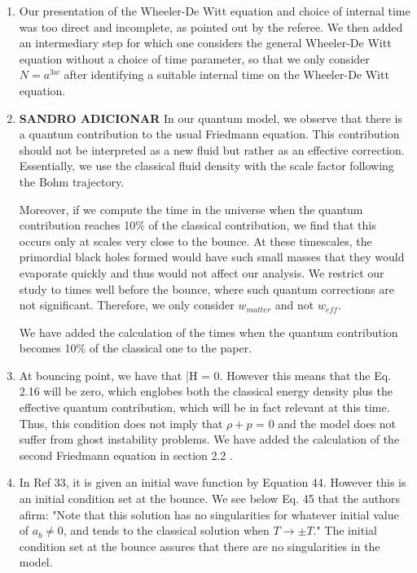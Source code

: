 \documentclass[a4paper,11pt]{article}
\begin{document}
\begin{enumerate}
    \begin{enumerate}
        \item Our presentation of the Wheeler-De Witt equation and choice of internal time was too direct and incomplete, as pointed out by the referee. We then added an intermediary step for which one considers the general Wheeler-De Witt equation without a choice of time parameter, so that we only consider $N = a^{3w}$ after identifying a suitable internal time on the Wheeler-De Witt equation.

        \item \textbf{SANDRO ADICIONAR} In our quantum model, we observe that there is a quantum contribution to the usual Friedmann equation. This contribution should not be interpreted as a new fluid but rather as an effective correction. Essentially, we use the classical fluid density with the scale factor following the Bohm trajectory.

        Moreover, if we compute the time in the universe when the quantum contribution reaches 10\% of the classical contribution, we find that this occurs only at scales very close to the bounce. At these timescales, the primordial black holes formed would have such small masses that they would evaporate quickly and thus would not affect our analysis. We restrict our study to times well before the bounce, where such quantum corrections are not significant. Therefore, we only consider $w_{matter}$ and not $w_{eff}$.

        We have added the calculation of the times when the quantum contribution becomes 10\% of the classical one to the paper.

        \item At bouncing point, we have that \bar{H} = 0. However this means that the Eq. 2.16 will be zero, which englobes both the classical energy density plus the effective quantum contribution, which will be in fact relevant at this time. Thus, this condition does not imply that $\rho + p$ = 0 and the model does not suffer from ghost instability problems. We have added the calculation of the second Friedmann equation in section 2.2 . 

        \item In Ref 33, it is given an initial wave function by Equation 44. However this is an initial condition set at the bounce. We see below Eq. 45 that the authors afirm: "Note that this solution has no singularities for whatever initial value of $a_b \neq 0$, and
        tends to the classical solution when $T \rightarrow \pm T$." The initial condition set at the bounce assures that there are no singularities in the model.
        

\end{enumerate}
\end{enumerate}
\end{document}
